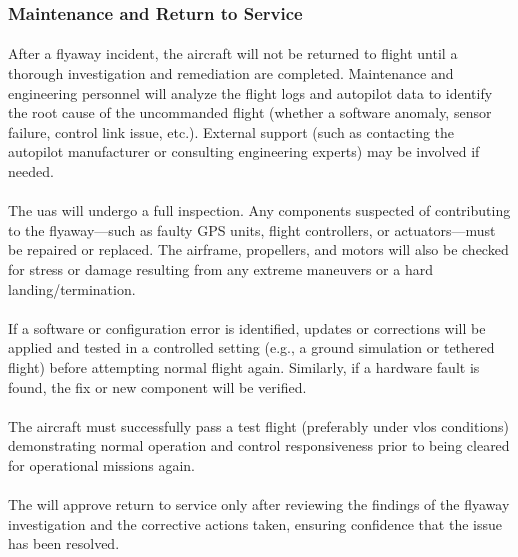             \subsubsection{Maintenance and Return to Service}
            
                \paragraph{} After a flyaway incident, the aircraft will not be returned to flight until a thorough investigation and remediation are completed. Maintenance and engineering personnel will analyze the flight logs and autopilot data to identify the root cause of the uncommanded flight (whether a software anomaly, sensor failure, control link issue, etc.). External support (such as contacting the autopilot manufacturer or consulting engineering experts) may be involved if needed.
                
                \paragraph{} The \ac{uas} will undergo a full inspection. Any components suspected of contributing to the flyaway—such as faulty GPS units, flight controllers, or actuators—must be repaired or replaced. The airframe, propellers, and motors will also be checked for stress or damage resulting from any extreme maneuvers or a hard landing/termination.
                
                \paragraph{} If a software or configuration error is identified, updates or corrections will be applied and tested in a controlled setting (e.g., a ground simulation or tethered flight) before attempting normal flight again. Similarly, if a hardware fault is found, the fix or new component will be verified.
                
                \paragraph{} The aircraft must successfully pass a test flight (preferably under \ac{vlos} conditions) demonstrating normal operation and control responsiveness prior to being cleared for operational missions again.
                
                \paragraph{} The  will approve return to service only after reviewing the findings of the flyaway investigation and the corrective actions taken, ensuring confidence that the issue has been resolved.
        
